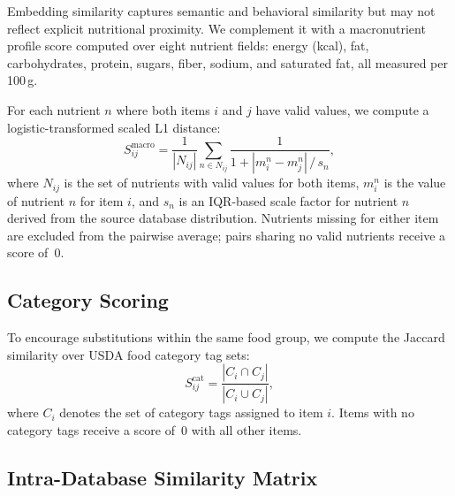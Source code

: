 \documentclass[journal]{IEEEtran}
\begin{document}
Embedding similarity captures semantic and behavioral similarity but
may not reflect explicit nutritional proximity. We complement it with
a macronutrient profile score computed over eight nutrient fields:
energy (kcal), fat, carbohydrates, protein, sugars, fiber, sodium, and
saturated fat, all measured per 100\,g.

For each nutrient $n$ where both items $i$ and $j$ have valid values,
we compute a logistic-transformed scaled L1 distance:
\begin{equation}
S_{ij}^{\mathrm{macro}} = \frac{1}{|N_{ij}|}\sum_{n \in N_{ij}}
\frac{1}{1 + |m_i^n - m_j^n| \,/\, s_n},
\label{eq:macro_sim}
\end{equation}
where $N_{ij}$ is the set of nutrients with valid values for both items,
$m_i^n$ is the value of nutrient $n$ for item $i$, and $s_n$ is an
IQR-based scale factor for nutrient $n$ derived from the source database
distribution. Nutrients missing for either item are excluded from the
pairwise average; pairs sharing no valid nutrients receive a score of~0.

\subsection{Category Scoring}
\label{subsec:category_scoring}

To encourage substitutions within the same food group, we compute the
Jaccard similarity over USDA food category tag sets:
\begin{equation}
S_{ij}^{\mathrm{cat}} =
\frac{|C_i \cap C_j|}{|C_i \cup C_j|},
\label{eq:cat_sim}
\end{equation}
where $C_i$ denotes the set of category tags assigned to item $i$.
Items with no category tags receive a score of~0 with all other items.

\subsection{Intra-Database Similarity Matrix}
\label{subsec:matrix}
\end{document}
